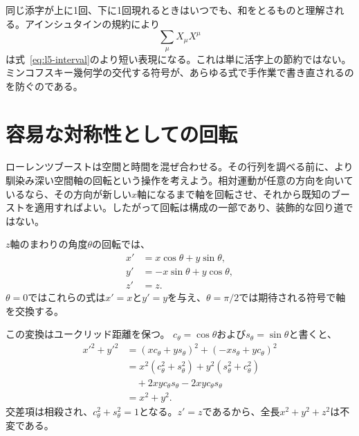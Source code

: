 同じ添字が上に1回、下に1回現れるときはいつでも、和をとるものと理解される。アインシュタインの規約により
\begin{equation}
\sum_{\mu}X_\mu X^\mu
\end{equation}
は式~\eqref{eq:l5-interval}のより短い表現になる。これは単に活字上の節約ではない。ミンコフスキー幾何学の交代する符号が、あらゆる式で手作業で書き直されるのを防ぐのである。

\begin{classroomqa}
\end{classroomqa}

\section{容易な対称性としての回転}

ローレンツブーストは空間と時間を混ぜ合わせる。その行列を調べる前に、より馴染み深い空間軸の回転という操作を考えよう。相対運動が任意の方向を向いているなら、その方向が新しい\(x\)軸になるまで軸を回転させ、それから既知のブーストを適用すればよい。したがって回転は構成の一部であり、装飾的な回り道ではない。

\(z\)軸のまわりの角度\(\theta\)の回転では、
\begin{align}
x'&=x\cos\theta+y\sin\theta,\nonumber\\
y'&=-x\sin\theta+y\cos\theta,\label{eq:l5-rotation}\\
z'&=z.\nonumber
\end{align}
\(\theta=0\)ではこれらの式は\(x'=x\)と\(y'=y\)を与え、\(\theta=\pi/2\)では期待される符号で軸を交換する。

この変換はユークリッド距離を保つ。
\(c_\theta=\cos\theta\)および\(s_\theta=\sin\theta\)と書くと、
\begin{align}
x'^2+y'^2
&=(xc_\theta+ys_\theta)^2+(-xs_\theta+yc_\theta)^2\nonumber\\
&=x^2(c_\theta^2+s_\theta^2)
  +y^2(s_\theta^2+c_\theta^2)\nonumber\\
&\quad+2xyc_\theta s_\theta-2xyc_\theta s_\theta\nonumber\\
&=x^2+y^2.
\end{align}
交差項は相殺され、\(c_\theta^2+s_\theta^2=1\)となる。\(z'=z\)であるから、全長\(x^2+y^2+z^2\)は不変である。


